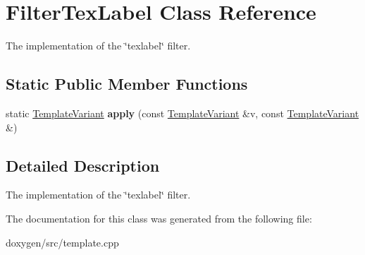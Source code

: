 \hypertarget{class_filter_tex_label}{}\section{Filter\+Tex\+Label Class Reference}
\label{class_filter_tex_label}


The implementation of the \char`\"{}texlabel\char`\"{} filter.  


\subsection*{Static Public Member Functions}
\begin{DoxyCompactItemize}
\item 
\mbox{\label{class_filter_tex_label_ad511c74d02bfbf22023ed2a42751fd16}} 
static \mbox{\hyperlink{class_template_variant}{Template\+Variant}} {\bfseries apply} (const \mbox{\hyperlink{class_template_variant}{Template\+Variant}} \&v, const \mbox{\hyperlink{class_template_variant}{Template\+Variant}} \&)
\end{DoxyCompactItemize}


\subsection{Detailed Description}
The implementation of the \char`\"{}texlabel\char`\"{} filter. 

The documentation for this class was generated from the following file\+:\begin{DoxyCompactItemize}
\item 
doxygen/src/template.\+cpp\end{DoxyCompactItemize}
